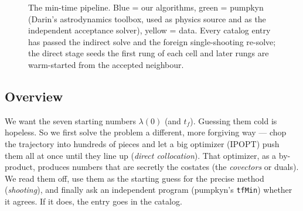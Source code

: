 \documentclass[11pt]{article}
\newcommand{\tf}{t_f}\newcommand{\R}{\mathbb{R}}
\newcommand{\file}[1]{\texttt{#1}}
\begin{document}
\begin{figure}[t]
\caption{The min-time pipeline. Blue = our algorithms, green = pumpkyn (Darin's astrodynamics toolbox, used as physics source and as the independent acceptance solver), yellow = data. Every catalog entry has passed the indirect solve and the foreign single-shooting re-solve; the direct stage seeds the first rung of each cell and later rungs are warm-started from the accepted neighbour.}
\label{fig:mt-pipeline}
\end{figure}

\subsection{Overview}
\begin{eli}
We want the seven starting numbers $\lambda(0)$ (and $\tf$). Guessing them
cold is hopeless. So we first solve the problem a different, more forgiving
way --- chop the trajectory into hundreds of pieces and let a big optimizer
(IPOPT) push them all at once until they line up (\emph{direct collocation}).
That optimizer, as a by-product, produces numbers that are secretly the
costates (the \emph{covectors} or duals). We read them off, use them as the
starting guess for the precise method (\emph{shooting}), and finally ask an
independent program (pumpkyn's \file{tfMin}) whether it agrees. If it does,
the entry goes in the catalog.
\end{eli}
\end{document}
